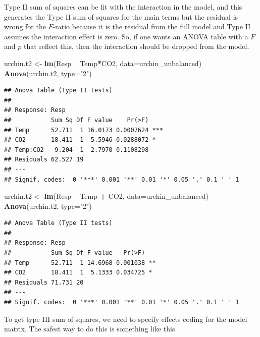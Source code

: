 \documentclass[]{book}
\newenvironment{Shaded}{\begin{snugshade}}{\end{snugshade}}
\newcommand{\DataTypeTok}[1]{\textcolor[rgb]{0.13,0.29,0.53}{#1}}
\newcommand{\KeywordTok}[1]{\textcolor[rgb]{0.13,0.29,0.53}{\textbf{#1}}}
\newcommand{\NormalTok}[1]{#1}
\newcommand{\OperatorTok}[1]{\textcolor[rgb]{0.81,0.36,0.00}{\textbf{#1}}}
\newcommand{\StringTok}[1]{\textcolor[rgb]{0.31,0.60,0.02}{#1}}
\begin{document}
Type II sum of squares can be fit with the interaction in the model, and this generates the Type II sum of squares for the main terms but the residual is wrong for the \(F\)-ratio because it is the residual from the full model and Type II assumes the interaction effect is zero. So, if one wants an ANOVA table with a \(F\) and \(p\) that reflect this, then the interaction should be dropped from the model.

\begin{Shaded}
\begin{Highlighting}[]
\NormalTok{urchin.t2 <-}\StringTok{ }\KeywordTok{lm}\NormalTok{(Resp }\OperatorTok{~}\StringTok{ }\NormalTok{Temp}\OperatorTok{*}\NormalTok{CO2, }\DataTypeTok{data=}\NormalTok{urchin_unbalanced)}
\KeywordTok{Anova}\NormalTok{(urchin.t2, }\DataTypeTok{type=}\StringTok{"2"}\NormalTok{)}
\end{Highlighting}
\end{Shaded}

\begin{verbatim}
## Anova Table (Type II tests)
## 
## Response: Resp
##           Sum Sq Df F value    Pr(>F)    
## Temp      52.711  1 16.0173 0.0007624 ***
## CO2       18.411  1  5.5946 0.0288072 *  
## Temp:CO2   9.204  1  2.7970 0.1108298    
## Residuals 62.527 19                      
## ---
## Signif. codes:  0 '***' 0.001 '**' 0.01 '*' 0.05 '.' 0.1 ' ' 1
\end{verbatim}

\begin{Shaded}
\begin{Highlighting}[]
\NormalTok{urchin.t2 <-}\StringTok{ }\KeywordTok{lm}\NormalTok{(Resp }\OperatorTok{~}\StringTok{ }\NormalTok{Temp }\OperatorTok{+}\StringTok{ }\NormalTok{CO2, }\DataTypeTok{data=}\NormalTok{urchin_unbalanced)}
\KeywordTok{Anova}\NormalTok{(urchin.t2, }\DataTypeTok{type=}\StringTok{"2"}\NormalTok{)}
\end{Highlighting}
\end{Shaded}

\begin{verbatim}
## Anova Table (Type II tests)
## 
## Response: Resp
##           Sum Sq Df F value   Pr(>F)   
## Temp      52.711  1 14.6968 0.001038 **
## CO2       18.411  1  5.1333 0.034725 * 
## Residuals 71.731 20                    
## ---
## Signif. codes:  0 '***' 0.001 '**' 0.01 '*' 0.05 '.' 0.1 ' ' 1
\end{verbatim}

To get type III sum of squares, we need to specify effects coding for the model matrix. The safest way to do this is something like this
\end{document}

